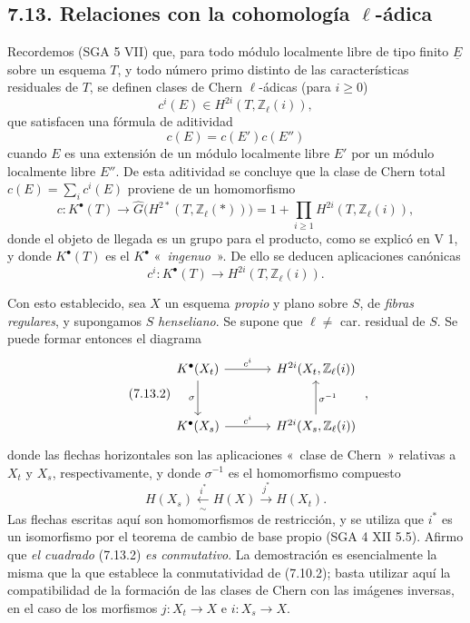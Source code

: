 \subsection*{7.13. Relaciones con la cohomología \(\ell\)-ádica}
Recordemos (SGA 5 VII) que, para todo módulo localmente libre de tipo finito \(\underline{E}\) sobre un esquema \(T\), y todo número primo distinto de las características residuales de \(T\), se definen clases de Chern \(\ell\)-ádicas (para \(i\geq 0\))
\[
  c^i(E)\in H^{2i}(T,\mathbb Z_\ell(i)),
\]
que satisfacen una fórmula de aditividad
\[
  c(E)=c(E')c(E'')
\]
cuando \(E\) es una extensión de un módulo localmente libre \(E'\) por un módulo localmente libre \(E''\). De esta aditividad se concluye que la clase de Chern total \(c(E)=\sum_i c^i(E)\) proviene de un homomorfismo
\begin{equation}\tag{7.13.0}
  c:K^\bullet(T)\longrightarrow
  \widehat G\bigl(H^{2*}(T,\mathbb Z_\ell(*))\bigr)
  =
  1+\prod_{i\geq 1}H^{2i}(T,\mathbb Z_\ell(i)),
\end{equation}
donde el objeto de llegada es un grupo para el producto, como se explicó en V 1, y donde \(K^\bullet(T)\) es el \(K^\bullet\) «~\emph{ingenuo}~». De ello se deducen aplicaciones canónicas
\begin{equation}\tag{7.13.1}
  c^i:K^\bullet(T)\longrightarrow H^{2i}(T,\mathbb Z_\ell(i)).
\end{equation}

Con esto establecido, sea \(X\) un esquema \emph{propio} y plano sobre \(S\), de \emph{fibras regulares}, y supongamos \(S\) \emph{henseliano}. Se supone que \(\ell\neq\) car. residual de \(S\). Se puede formar entonces el diagrama
\begin{equation}\tag{7.13.2}
\begin{tikzcd}[column sep=large,row sep=large]
K^\bullet(X_t) \arrow[r,"c^i"] \arrow[d,"\sigma"'] &
H^{2i}(X_t,\mathbb Z_\ell(i))\\
K^\bullet(X_s) \arrow[r,"c^i"] &
\sisi{K^{2i}}{H^{2i}}(X_s,\mathbb Z_\ell(i)) \arrow[u,"\sigma^{-1}"'] %
\end{tikzcd}
\;,
\end{equation}
donde las flechas horizontales son las aplicaciones «~clase de Chern~» relativas a \(X_t\) y \(X_s\), respectivamente, y donde \(\sigma^{-1}\) es el homomorfismo compuesto
\[
  H(X_s)\xleftarrow[\sim]{i^*}H(X)\xrightarrow{j^*}H(X_t).
\]
Las flechas escritas aquí son homomorfismos de restricción, y se utiliza que \(i^*\) es un isomorfismo por el teorema de cambio de base propio (SGA 4 XII 5.5). Afirmo que \emph{el cuadrado} (7.13.2) \emph{es conmutativo}. La demostración es esencialmente la misma que la que establece la conmutatividad de (7.10.2); basta utilizar aquí la compatibilidad de la formación de las clases de Chern con las imágenes inversas, en el caso de los morfismos \(j:X_t\to X\) e \(i:X_s\to X\).

